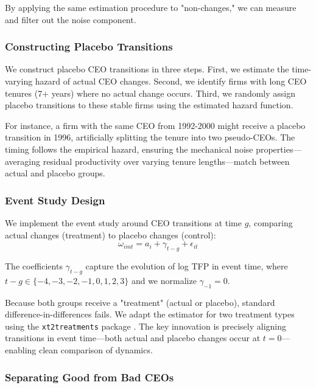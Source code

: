 \documentclass[11pt,a4paper]{article}
\begin{document}
By applying the same estimation procedure to "non-changes," we can measure and filter out the noise component.

\subsubsection{Constructing Placebo Transitions}

We construct placebo CEO transitions in three steps. First, we estimate the time-varying hazard of actual CEO changes. Second, we identify firms with long CEO tenures (7+ years) where no actual change occurs. Third, we randomly assign placebo transitions to these stable firms using the estimated hazard function.

For instance, a firm with the same CEO from 1992-2000 might receive a placebo transition in 1996, artificially splitting the tenure into two pseudo-CEOs. The timing follows the empirical hazard, ensuring the mechanical noise properties—averaging residual productivity over varying tenure lengths—match between actual and placebo groups.

\subsubsection{Event Study Design}

We implement the event study around CEO transitions at time $g$, comparing actual changes (treatment) to placebo changes (control):
\begin{equation}
\omega_{imt} = a_i + \gamma_{t-g} + \epsilon_{it}
\end{equation}

The coefficients $\gamma_{t-g}$ capture the evolution of log TFP in event time, where $t-g \in \{-4, -3, -2, -1, 0, 1, 2, 3\}$ and we normalize $\gamma_{-1} = 0$.

Because both groups receive a "treatment" (actual or placebo), standard difference-in-differences fails. We adapt the \citet{Callaway2021JoLE} estimator for two treatment types using the \texttt{xt2treatments} package \citep{Koren2024xt2treatments}. The key innovation is precisely aligning transitions in event time—both actual and placebo changes occur at $t=0$—enabling clean comparison of dynamics.

\subsubsection{Separating Good from Bad CEOs}
\end{document}
